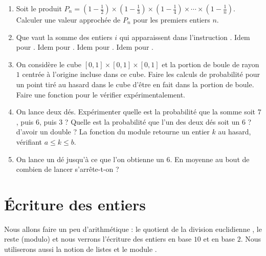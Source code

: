 \documentclass[class=report,crop=false]{standalone}
\begin{document}
\begin{miniexercices}
\begin{enumerate}
  \item Soit le produit $P_n = (1-\frac12)\times (1-\frac13) \times (1-\frac14)\times \cdots \times(1-\frac1n)$.
  Calculer une valeur approchée de $P_n$ pour les premiers entiers $n$.

  \item Que vaut la somme des entiers $i$ qui apparaissent dans l'instruction .
  Idem pour . Idem pour . Idem pour .
  Idem pour .

  \item On considère le cube $[0,1] \times [0,1] \times [0,1]$ et la portion de boule de rayon $1$ centrée à l'origine incluse dans ce cube.
  Faire les calculs de probabilité pour un point tiré au hasard dans le cube d'être en fait dans la portion de boule.
  Faire une fonction pour le vérifier expérimentalement.

  \item On lance deux dés. Expérimenter quelle est la probabilité que la somme soit $7$, puis $6$, puis $3$ ?
  Quelle est la probabilité que l'un des deux dés soit un $6$ ? d'avoir un double ?
  La fonction  du module  retourne un entier $k$
  au hasard, vérifiant $a \le k \le b$.

  \item On lance un dé jusqu'à ce que l'on obtienne un $6$. En moyenne au bout de combien de lancer s'arrête-t-on ?

\end{enumerate}
\end{miniexercices}



\section{\'Ecriture des entiers}

Nous allons faire un peu d'arithmétique : le quotient de la division euclidienne \codeinline{//},
le reste \codeinline{\%} (modulo) et nous verrons l'écriture des entiers en base $10$ et en base $2$.
Nous utiliserons aussi la notion de listes et le module .


\end{document}
